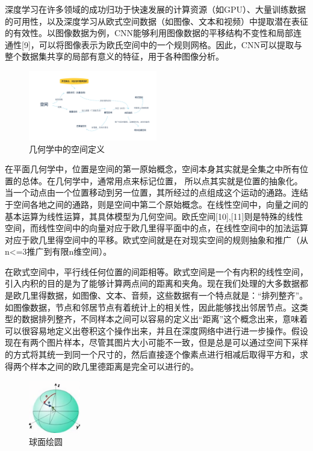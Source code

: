 \documentclass[10pt,journal,compsoc]{IEEEtran}
\begin{document}
深度学习在许多领域的成功归功于快速发展的计算资源（如GPU）、大量训练数据的可用性，以及深度学习从欧式空间数据（如图像、文本和视频）中提取潜在表征的有效性。以图像数据为例，CNN能够利用图像数据的平移结构不变性和局部连通性[9]，可以将图像表示为欧氏空间中的一个规则网格。因此，CNN可以提取与整个数据集共享的局部有意义的特征，用于各种图像分析。

\begin{figure}
	\centering
	\includegraphics[width=0.5\textwidth]{1-1}
	\caption{几何学中的空间定义}
	\label{fig:几何学中的空间定义}
\end{figure}

在平面几何学中，位置是空间的第一原始概念，空间本身其实就是全集之中所有位置的总体。在几何学中，通常用点来标记位置， 所以点其实就是位置的抽象化。当一个动点由一个位置移动到另一位置，其所经过的点组成这个运动的通路。连结于空间各地之间的通路，则是空间中第二个原始概念。在线性空间中，向量之间的基本运算为线性运算，其具体模型为几何空间。欧氏空间[10],[11]则是特殊的线性空间，而线性空间中的向量对应于欧几里得平面中的点，在线性空间中的加法运算对应于欧几里得空间中的平移。欧式空间就是在对现实空间的规则抽象和推广（从n<=3推广到有限n维空间）。

在欧式空间中，平行线任何位置的间距相等。欧式空间是一个有内积的线性空间，引入内积的目的是为了能够计算两点间的距离和夹角。现在我们处理的大多数据都是欧几里得数据，如图像、文本、音频，这些数据有一个特点就是：“排列整齐”。如图像数据，节点和邻居节点有着统计上的相关性，因此能够找出邻居节点。这类型的数据排列整齐，不同样本之间可以容易的定义出“距离”这个概念出来，意味着可以很容易地定义出卷积这个操作出来，并且在深度网络中进行进一步操作。假设现在有两个图片样本，尽管其图片大小可能不一致，但是总是可以通过空间下采样的方式将其统一到同一个尺寸的，然后直接逐个像素点进行相减后取得平方和，求得两个样本之间的欧几里德距离是完全可以进行的。

\begin{figure}
	\centering
	\includegraphics[width=0.2\textwidth]{1-2}
	\caption{球面绘圆}
	\label{fig:球面绘圆}
\end{figure}
\end{document}

